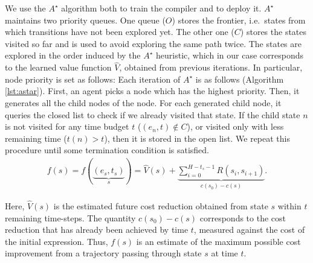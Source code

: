 \documentclass[fullpage,twocolumn]{article} %
\newcommand{\closed}{C}
\begin{document}
We use the $A^\star$ algorithm \citep{hart1968formal} both to train the compiler and to deploy it. $A^\star$ maintains two priority queues. One queue ($O$) stores the frontier, i.e.\ states from which transitions have not been explored yet. The other one ($C$) stores the states visited so far and is used to avoid exploring the same path twice. The states are explored in the order induced by the $A^\star$ heuristic, which in our case corresponds to the learned value function $\hat{V}$, obtained from previous iterations. In particular, node priority is set as follows:
Each iteration of $A^\star$ is as follows (Algorithm \ref{lst:astar}). First, an agent picks a node which has the highest priority. Then, it generates all the child nodes of the node. For each generated child node, it queries the closed list to check if we already visited that state. If the child state $n$ is not visited for any time budget $t$ ($(e_n, t) \notin \closed{}$), or visited only with less remaining time ($t(n) > t$), then it is stored in the open list. We  repeat this procedure until some termination condition is satisfied.
\begin{gather}
\label{eq-heuristic}
    f(s) = f(\underbrace{(e_s,t_s)}_s) =  \hat{V}(s) + \underbrace{\textstyle \sum_{i=0}^{H-t_s-1} R(s_i, s_{i+1})}_{c(s_0) - c(s)}.
\end{gather}

Here, $\hat{V}(s)$ is the estimated future cost reduction obtained from state $s$ within $t$ remaining time-steps. The quantity $c(s_0) - c(s)$ corresponds to the cost reduction that has already been achieved by time $t$, measured against the cost of the initial expression. Thus, $f(s)$ is an estimate of the maximum possible cost improvement from a trajectory passing through state $s$ at time $t$.

\end{document}
